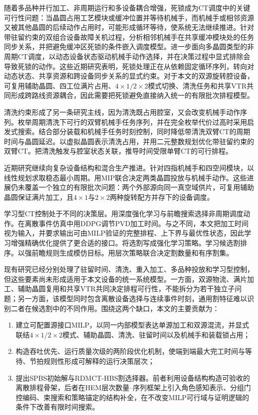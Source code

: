 \documentclass[final,5p,times,twocolumn]{elsarticle}
\newcommand{\method}{RDMCT-HBS}
\begin{document}
随着多品种并行加工、非周期运行和多设备耦合增强，死锁成为CT调度中的关键可行性问题：当晶圆占用工艺模块或缓冲位置并等待机械手，而机械手或相邻资源又被其他晶圆的后续动作占用时，可能形成循环等待，使系统无法继续推进。\citet{zhu2025failuredeadlock}针对带驻留约束的双组合设备故障关机过程，分析相邻机械手在共享缓冲模块处的任务同步关系，并把避免缓冲区死锁的条件嵌入调度模型。\citet{kim2025noncyclicdeadlock}进一步面向多晶圆类型的非周期CT调度，以动态设备状态驱动机械手动作选择，并在决策过程中显式排除会导致死锁的动作。这些近期研究表明，死锁处理正在从依赖固定循环序列，转向对动态状态、共享资源和跨设备同步关系的显式约束。对于本文的双源旋转腔设备，可复用辅助晶圆、四工位满片占用、$4\times1/2\times2$模式切换、清洗任务和共享VTR共同形成跨路线资源耦合，因此需要把死锁避免直接纳入统一的有限批次排程模型。

清洗约束形成了另一条研究主线，因为清洗既占用腔室，又会改变机械手动作序列。\citet{kim2013cleaning}枚举周期清洗下可行的双臂机械手任务序列，并在完全枚举代价过高时采用启发式搜索。\citet{yu2020delay}结合部分装载和机械手任务时刻控制，同时降低带清洗双臂CT的周期时间与晶圆延迟。\citet{qiao2022binary}以虚拟晶圆表示清洗占用，并用二元整数规划优化带驻留约束的双臂CT。\citet{li2022conditioncleaning}把清洗触发与腔室状态关联，推导时间受限单臂CT的可行排程。

近期研究继续向复杂设备结构和混合生产推进。\citet{gu2024multifinger}针对四指机械手和四空间模块，以线性规划求取稳态最小周期。\citet{yang2025miptwowafers}用MIP联合决定两类晶圆投放与机械手动作。这些进展仍未覆盖一个独立的有限批次问题：两个外部源向同一真空域供片，可复用辅助晶圆保证满片加工，且$4\times1$与$2\times2$两种旋转配方并存下的设备调度。

学习型CT控制处于不同的决策层。\citet{kim2025adaptivecluster}用深度强化学习与前瞻搜索选择非周期调度动作。\citet{hong2026ddpgct}在离散事件仿真中用DDPG调节PVD加工时间。与之不同，本文把加工时间视为输入，并要求输出可由MILP验证的完整排程、上下界与最优性状态，因此学习增强精确优化提供了更合适的接口。\citet{tang2020cut}将选割写成强化学习策略。\citet{huang2022cutranking}学习候选割排序。\citet{paulus2022looking}以强前瞻规则生成模仿目标。\citet{wang2023hem}用层次策略联合决定割数量和有序割集。

现有研究已经分别处理了驻留时间、清洗、重入加工、多品种投放和学习型控制，但这些要素尚未形成适用于本文设备的统一系统模型。一方面，双源物流、满片加工、辅助晶圆复用和共享VTR共同决定排程可行性，不能拆分为若干独立子问题；另一方面，该模型同时包含离散设备选择与连续事件时刻，通用割特征难以识别二者在候选割中的不同作用。围绕这两个缺口，本文的主要贡献为：
\begin{enumerate}[leftmargin=*]
\item 建立可配置源接口MILP，以同一内部模型表达单源加工和双源混流，并显式联结$4\times1/2\times2$模式、辅助晶圆、清洗、驻留时间以及机械手和装载锁占用；
\item 构造吞吐优先、运行质量次级的两阶段优化机制，使端到端最大完工时间与等待、节拍规则性形成可解释的运行决策层次；
\item 提出SPBS初始解与\method{}割选择器。前者利用设备结构构造可验收的离散排程骨架，后者在HEM层次数量--序列框架上引入角色感知表示、分组门控编码、束搜索和策略锚定的结构补全，在不改变MILP可行域与证明逻辑的条件下改善有限时间搜索。
\end{enumerate}
\end{document}

